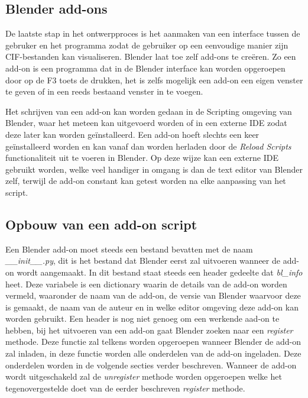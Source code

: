 \subsection{Blender add-ons}
De laatste stap in het ontwerpproces is het aanmaken van een interface tussen de gebruker en het programma zodat de gebruiker op een eenvoudige manier zijn CIF-bestanden kan visualiseren. Blender laat toe zelf add-ons te creëren. Zo een add-on is een programma dat in de Blender interface kan worden opgeroepen door op de F3 toets de drukken, het is zelfs mogelijk een add-on een eigen venster te geven of in een reeds bestaand venster in te voegen.
\par
Het schrijven van een add-on kan worden gedaan in de Scripting omgeving van Blender, waar het meteen kan uitgevoerd worden of in een externe IDE zodat deze later kan worden geïnstalleerd. Een add-on hoeft slechts een keer geïnstalleerd worden en kan vanaf dan worden herladen door de \textit{Reload Scripts} functionaliteit uit te voeren in Blender. Op deze wijze kan een externe IDE gebruikt worden, welke veel handiger in omgang is dan de text editor van Blender zelf, terwijl de add-on constant kan getest worden na elke aanpassing van het script.

\subsection{Opbouw van een add-on script}
Een Blender add-on moet steeds een bestand bevatten met de naam \textit{\_\_init\_\_.py}, dit is het bestand dat Blender eerst zal uitvoeren wanneer de add-on wordt aangemaakt. In dit bestand staat steeds een header gedeelte dat \textit{bl\_info} heet. Deze variabele is een dictionary waarin de details van de add-on worden vermeld, waaronder de naam van de add-on, de versie van Blender waarvoor deze is gemaakt, de naam van de auteur en in welke editor omgeving deze add-on kan worden gebruikt. Een header is nog niet genoeg om een werkende aad-on te hebben, bij het uitvoeren van een add-on gaat Blender zoeken naar een \textit{register} methode. Deze functie zal telkens worden opgeroepen wanneer Blender de add-on zal inladen, in deze functie worden alle onderdelen van de add-on ingeladen. Deze onderdelen worden in de volgende secties verder beschreven. Wanneer de add-on wordt uitgeschakeld zal de \textit{unregister} methode worden opgeroepen welke het tegenovergestelde doet van de eerder beschreven \textit{register} methode.
\par
